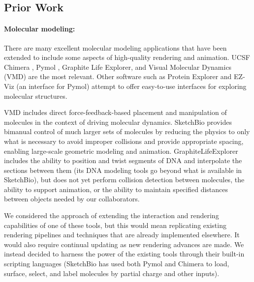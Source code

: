 \documentclass[twocolumn]{bmcart}%
\begin{document}
\subsection*{Prior Work}
\paragraph*{Molecular modeling:}
There are many excellent molecular modeling applications that have been extended to include some aspects of high-quality rendering and animation.
UCSF Chimera \cite{pettersen2004ucsf}, Pymol \cite{pymol2013}, Graphite Life Explorer\cite{hornus2013easy}, and Visual Molecular Dynamics (VMD) \cite{humphrey1996} are the most relevant.
Other software such as Protein Explorer \cite{martz2002protein} and EZ-Viz \cite{grell2006ez} (an interface for Pymol) attempt to offer easy-to-use interfaces for exploring molecular structures.

VMD includes direct force-feedback-based placement and manipulation of molecules in the context of driving molecular dynamics.  SketchBio provides bimanual control of much larger sets of molecules by reducing the physics to only what is necessary to avoid improper collisions and provide appropriate spacing, enabling large-scale geometric modeling and animation.
GraphiteLifeExplorer includes the ability to position and twist segments of DNA and interpolate the sections between them (its DNA modeling tools go beyond what is available in SketchBio), but does not yet perform collision detection between molecules, the ability to support animation, or the ability to maintain specified distances between objects needed by our collaborators.

We considered the approach of extending the interaction and rendering capabilities of one of these tools, but this would mean replicating existing rendering pipelines and techniques that are already implemented elsewhere.
It would also require continual updating as new rendering advances are made.
We instead decided to harness the power of the existing tools through their built-in scripting languages (SketchBio has used both Pymol and Chimera to load, surface, select, and label molecules by partial charge and other inputs).
\end{document}
